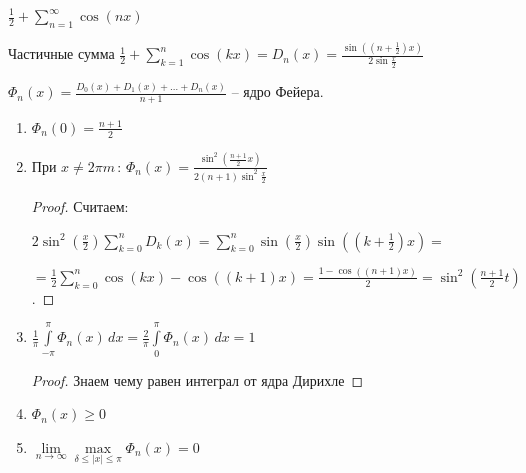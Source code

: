 \begin{example}
    $\frac{1}{2} + \sum\limits_{n=1}^\infty \cos (nx)$

    Частичные сумма $\frac{1}{2} + \sum\limits_{k=1}^n \cos (kx) = D_n (x) = \frac{\sin ((n + \frac{1}{2})x)}{2\sin \frac{x}{2}}$

    \begin{definition}
        $\Phi_n (x) = \frac{D_0 (x) + D_1 (x) + \ldots + D_n (x)}{n + 1}$ -- ядро Фейера.
    \end{definition}

    \begin{properties}
        \begin{enumerate}
            \item {
                $\Phi_n (0) = \frac{n + 1}{2}$
            }
            \item {
                При $x \neq 2\pi m \, : \, \Phi_n (x) = \frac{\sin^2 \left(\frac{n + 1}{2} x\right)}{2(n + 1)\sin^2 \frac{x}{2}}$

                \begin{proof}


                    Считаем:

                    $2 \sin^2(\frac{x}{2}) \sum_{k=0}^{n} D_k(x) = \sum_{k=0}^{n} \sin(\frac{x}{2}) \sin((k + \frac{1}{2}) x) =$

                    $= \frac{1}{2} \sum_{k=0}^{n} \cos(kx) - \cos((k + 1) x) = \frac{1 - \cos((n+1) x)}{2} = \sin^2(\frac{n+1}{2} t)$.
                \end{proof}
            }
            \item {
                $\frac{1}{\pi} \int\limits_{-\pi}^\pi \Phi_n (x) \, dx = \frac{2}{\pi} \int\limits_0^\pi \Phi_n (x) \, dx = 1$

                \begin{proof}
                    Знаем чему равен интеграл от ядра Дирихле
                \end{proof}
            }
            \item {
                $\Phi_n (x) \geqslant 0$
            }
            \item {
                $\lim\limits_{n \to \infty} \max\limits_{\delta \leqslant |x| \leqslant \pi} \Phi_n (x) = 0$

}
\end{enumerate}
\end{properties}
\end{example}
